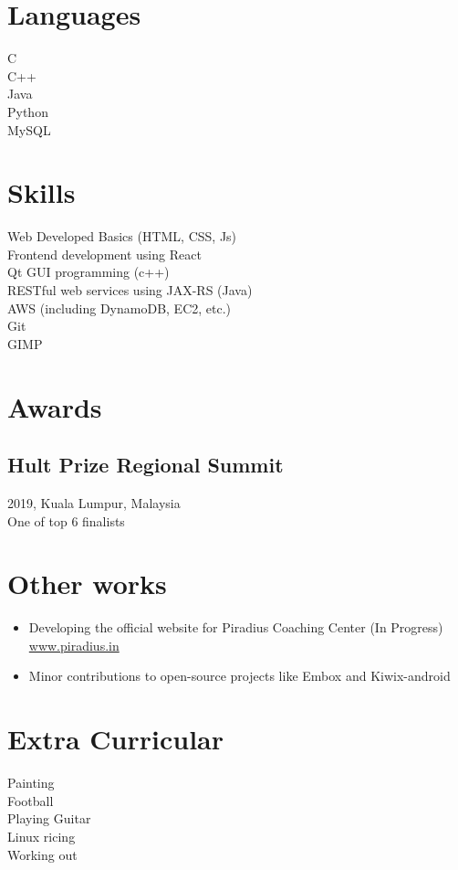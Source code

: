 \documentclass[]{deedy-resume-openfont}
\begin{document}
\begin{minipage}[t]{0.33\textwidth} 
\section{Languages} 
C\\
C++\\
Java\\
Python\\
MySQL\\

\section{Skills} 
Web Developed Basics (HTML, CSS, Js)\\
Frontend development using React\\
Qt GUI programming (c++)\\
RESTful web services using JAX-RS (Java)\\
AWS (including DynamoDB, EC2, etc.)\\
Git\\
GIMP\\



\section{Awards}
\subsection{Hult Prize Regional Summit}
2019, Kuala Lumpur, Malaysia\\
One of top 6 finalists
\sectionsep


\section{Other works} 
\begin{itemize}
	\item Developing the official website for Piradius Coaching Center (In Progress)\\
	\href{https:\\www.piradius.in}{www.piradius.in}
	\item Minor contributions to open-source projects like Embox and Kiwix-android
\end{itemize}


\section{Extra Curricular}
Painting\\
Football\\
Playing Guitar\\
Linux ricing\\
Working out\\

\end{minipage} 
\end{document}
